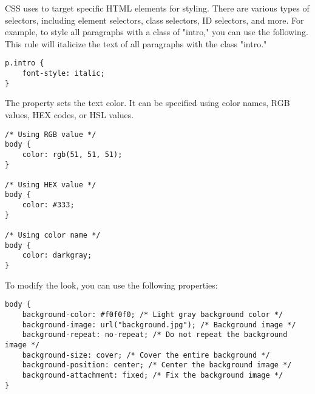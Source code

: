 CSS uses  to target specific HTML elements for styling. There are various types of selectors, including element selectors, class selectors, ID selectors, and more. For example, to style all paragraphs with a class of "intro," you can use the following. This rule will italicize the text of all paragraphs with the class "intro."
\begin{lstlisting}
p.intro {
    font-style: italic;
}
\end{lstlisting}

The  property sets the text color. It can be specified using color names, RGB values, HEX codes, or HSL values.
\begin{lstlisting}
/* Using RGB value */
body {
    color: rgb(51, 51, 51);
}

/* Using HEX value */
body {
    color: #333;
}

/* Using color name */
body {
    color: darkgray;
}
\end{lstlisting}

To modify the  look, you can use the following properties:

\begin{lstlisting}
body {
    background-color: #f0f0f0; /* Light gray background color */
    background-image: url("background.jpg"); /* Background image */
    background-repeat: no-repeat; /* Do not repeat the background image */
    background-size: cover; /* Cover the entire background */
    background-position: center; /* Center the background image */
    background-attachment: fixed; /* Fix the background image */
}
\end{lstlisting}